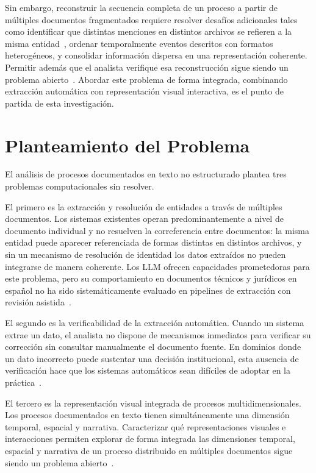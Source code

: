 Sin embargo, reconstruir la secuencia completa de un proceso 
a partir de múltiples documentos fragmentados requiere 
resolver desafíos adicionales tales como identificar que 
distintas menciones en distintos archivos se refieren a la 
misma entidad~\cite{cattan2021crossdoc}, ordenar 
temporalmente eventos descritos con formatos heterogéneos, 
y consolidar información dispersa en una representación 
coherente. Permitir además que el analista verifique esa 
reconstrucción sigue siendo un problema 
abierto~\cite{pereira2023inacia}. Abordar este problema de 
forma integrada, combinando extracción automática con 
representación visual interactiva, es el punto de partida 
de esta investigación.

\section{Planteamiento del Problema}

El análisis de procesos documentados en texto no estructurado 
plantea tres problemas computacionales sin resolver.

El primero es la extracción y resolución de entidades a través 
de múltiples documentos. Los sistemas existentes operan 
predominantemente a nivel de documento individual y no resuelven 
la correferencia entre documentos: la misma entidad puede aparecer 
referenciada de formas distintas en distintos archivos, y sin un 
mecanismo de resolución de identidad los datos extraídos no pueden 
integrarse de manera coherente. Los \acs{LLM} ofrecen capacidades 
prometedoras para este problema, pero su comportamiento en 
documentos técnicos y jurídicos en español no ha sido 
sistemáticamente evaluado en pipelines de extracción con revisión 
asistida~\cite{zhong-etal-2020-nlp}.

El segundo es la verificabilidad de la extracción automática. 
Cuando un sistema extrae un dato, el analista no dispone de 
mecanismos inmediatos para verificar su corrección sin consultar 
manualmente el documento fuente. En dominios donde un dato incorrecto puede sustentar una decisión institucional, esta ausencia de verificación hace que los sistemas automáticos sean difíciles de adoptar en la práctica~\cite{ji2023}.

El tercero es la representación visual integrada de procesos 
multidimensionales. Los procesos documentados en texto tienen 
simultáneamente una dimensión temporal, espacial y narrativa. 
Caracterizar qué representaciones visuales e interacciones permiten explorar de forma integrada las dimensiones temporal, espacial y narrativa de un proceso distribuido en múltiples documentos sigue siendo un problema abierto~\cite{zhao2023contextwing, rajabiyazdi2024textvista, ye2024storyexplorer, yeh2025storyribbons}.

